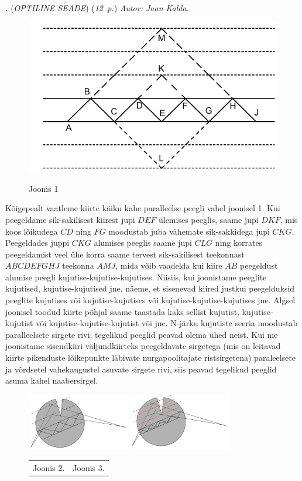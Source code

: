 \documentclass[11pt,a5paper]{article}
\newcommand{\numb}[1]{\vspace{5pt}\textbf{\large #1}}
\newcommand{\nimi}[1]{(\textsl{\small #1})}
\newcommand{\punktid}[1]{(\emph{#1~p.})}
\newcounter{ylesanne}
\newcommand{\yl}[1]{\addtocounter{ylesanne}{1}\numb{\theylesanne.} \nimi{#1} \newblock{}}
\newcommand{\autor}[1]{\emph{ Autor: #1.\\}}
\begin{document}
\yl{OPTILINE SEADE}
\punktid{12}
\autor{Jaan Kalda}
\begin{figure}[h]
\centering
\includegraphics[width=0.5\linewidth]{optiline-silinder-lah1.pdf}\par
Joonis 1
\end{figure}
Kõigepealt vaatleme kiirte käiku kahe paralleelse peegli vahel joonisel 1. Kui peegeldame sik-sakilisest kiirest jupi $DEF$ ülemises peeglis, saame jupi $DKF$, mis koos lõikudega $CD$ ning $FG$ moodustab juba vähemate sik-sakkidega jupi $CKG$. Peegeldades juppi $CKG$  alumises peeglis saame jupi $CLG$ ning korrates peegeldamist veel ühe korra saame tervest sik-sakilisest teekonnast $ABCDEFGHJ$ teekonna $AMJ$, mida võib vaadelda kui kiire $AB$ peegeldust alumise peegli kujutise-kujutise-kujutises. Niisiis, kui joonistame peeglite kujutised, kujutise-kujutised jne, näeme, et sisenevad kiired justkui peegelduksid peeglite kujutises või kujutise-kujutises või kujutise-kujutise-kujutises jne. Algsel joonisel toodud kiirte põhjal saame taastada kaks sellist kujutist, kujutise-kujutist või kujutise-kujutise-kujutist  või jne. N-järku kujutiste seeria moodustab paralleelsete sirgete rivi; tegelikud peeglid peavad olema ühed neist. Kui me joonistame sisendkiiri väljundkiirteks peegeldavate  sirgetega (mis on leitavad kiirte pikenduste lõikepunkte läbivate nurgapoolitajate ristsirgetena) paraleelsete ja võrdsetel vahekaugustel asuvate sirgete rivi, siis peavad tegelikud peeglid asuma kahel naabersirgel.

\begin{figure}[h]
\centering
  \includegraphics[width=0.4\textwidth]{optiline-silinder-lah2.pdf}
  \includegraphics[width=0.4\textwidth]{optiline-silinder-lah3.pdf}
  \par
  \begin{tabular}{p{0.5\linewidth}p{0.5\linewidth}}
  \hfil Joonis 2. & \hfil Joonis 3. \\
  \end{tabular}
\end{figure}
\end{document}
